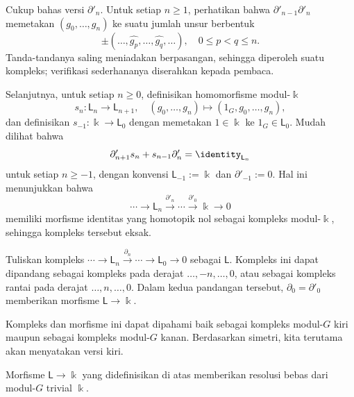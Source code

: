 \begin{bukti}
	Cukup bahas versi $\partial'_n$. Untuk setiap $n\geq1$, perhatikan bahwa
	$\partial'_{n-1}\partial'_n$ memetakan $(g_0,\ldots,g_n)$ ke suatu jumlah
	unsur berbentuk
	\[ \pm (\ldots, \widehat{g_p}, \ldots, \widehat{g_q}, \ldots), \quad 0 \leq p < q \leq n. \]
	Tanda-tandanya saling meniadakan berpasangan, sehingga diperoleh suatu
	kompleks; verifikasi sederhananya diserahkan kepada pembaca.

	Selanjutnya, untuk setiap $n\geq0$, definisikan homomorfisme modul-$\Bbbk$
	\[ s_n: \mathsf{L}_n \to \mathsf{L}_{n+1}, \quad (g_0, \ldots, g_n) \mapsto (1_G, g_0, \ldots, g_n), \]
	dan definisikan $s_{-1}:\Bbbk\to\mathsf{L}_0$ dengan memetakan
	$1\in\Bbbk$ ke $1_G\in\mathsf{L}_0$. Mudah dilihat bahwa
	\[ \partial'_{n+1} s_n + s_{n-1} \partial'_n = \identity_{\mathsf{L}_n} \]
	untuk setiap $n\geq-1$, dengan konvensi $\mathsf{L}_{-1}:=\Bbbk$ dan
	$\partial'_{-1}:=0$. Hal ini menunjukkan bahwa
	\[ \cdots \to \mathsf{L}_n \xrightarrow{\partial'_n} \cdots \xrightarrow{\partial'_0} \Bbbk \to 0 \]
	memiliki morfisme identitas yang homotopik nol sebagai kompleks
	modul-$\Bbbk$, sehingga kompleks tersebut eksak.
\end{bukti}


Tuliskan kompleks
$\cdots\to\mathsf{L}_n\xrightarrow{\partial_n}\cdots\to\mathsf{L}_0\to0$
sebagai $\mathsf{L}$. Kompleks ini dapat dipandang sebagai kompleks pada
derajat $\ldots,-n,\ldots,0$, atau sebagai kompleks rantai pada derajat
$\ldots,n,\ldots,0$. Dalam kedua pandangan tersebut,
$\partial_0=\partial'_0$ memberikan morfisme $\mathsf{L}\to\Bbbk$.

Kompleks dan morfisme ini dapat dipahami baik sebagai kompleks modul-$G$ kiri
maupun sebagai kompleks modul-$G$ kanan. Berdasarkan simetri, kita terutama akan
menyatakan versi kiri.

\begin{proposisi}\label{prop:trivial-mod-resolution}
	Morfisme $\mathsf{L}\to\Bbbk$ yang didefinisikan di atas memberikan resolusi
	bebas dari modul-$G$ trivial $\Bbbk$.
\end{proposisi}

